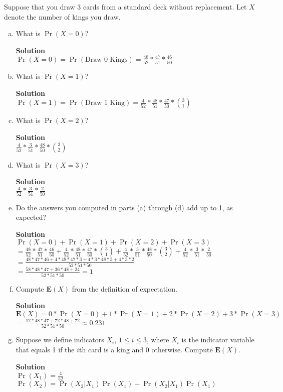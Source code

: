 \documentclass[11pt]{article}
\newenvironment{Answer}{\vspace{10pt}\begin{mdframed}\textbf{Solution}\\}{\end{mdframed}\vfill\pagebreak[3]}
\newenvironment{Answer}{\vspace{10pt}}{\vfill\pagebreak[3]}
\newcommand*{\E}{\textbf{E}}
\begin{document}
Suppose that you draw 3 cards from a standard deck without replacement. Let $X$ denote the number of kings you draw.
\begin{enumerate}[(a)]
    \item What is $\Pr(X = 0)$?
    \begin{Answer}
$\Pr(X=0)=\Pr(\text{Draw 0 Kings})=\frac{48}{52}*\frac{47}{51}*\frac{46}{50}$
    \end{Answer}
    \item What is $\Pr(X = 1)$?
    \begin{Answer}
$\Pr(X=1)=\Pr(\text{Draw 1 King})=\frac{4}{52}*\frac{48}{51}*\frac{47}{50}*\binom{3}{1}$
    \end{Answer}
    \item What is $\Pr(X = 2)$?
    \begin{Answer}
$\frac{4}{52}*\frac{3}{51}*\frac{48}{50}*\binom{3}{2}$
    \end{Answer}
    \item What is $\Pr(X = 3)$?
    \begin{Answer}
$\frac{4}{52}*\frac{3}{51}*\frac{2}{50}$
    \end{Answer}
    \item Do the answers you computed in parts (a) through (d) add up to 1, as expected?
    \begin{Answer}
$\Pr(X=0)+\Pr(X=1)+\Pr(X=2)+\Pr(X=3)$\\
$=\frac{48}{52}*\frac{47}{51}*\frac{46}{50}+\frac{4}{52}*\frac{48}{51}*\frac{47}{50}*\binom{3}{1}+\frac{4}{52}*\frac{3}{51}*\frac{48}{50}*\binom{3}{2}+\frac{4}{52}*\frac{3}{51}*\frac{2}{50}$\\
$=\frac{48*47*46+4*48*47*3+4*3*48*3+4*3*2}{52*51*50}$\\
$=\frac{58*48*47+36*48+24}{52*51*50}=1$
    \end{Answer}
    \item Compute $\E(X)$ from the definition of expectation.
    \begin{Answer}
$\E(X)=0*\Pr(X=0)+1*\Pr(X=1)+2*\Pr(X=2)+3*\Pr(X=3)$\\
$=\frac{12*48*47+72*48+72}{52*51*50}\approx0.231$
    \end{Answer}
    \item Suppose we define indicators $X_i$, $1 \leq i \leq 3$, where $X_i$ is the indicator variable that equals 1 if the $i$th card is a king and 0 otherwise. Compute $\E(X)$.
    \begin{Answer}
$\Pr(X_1)=\frac{4}{52}$\\
$\Pr(X_2)=\Pr(X_2|X_1)\Pr(X_1)+\Pr(X_2|X_1)\Pr(X_1)$\\

\end{Answer}
\end{enumerate}
\end{document}
